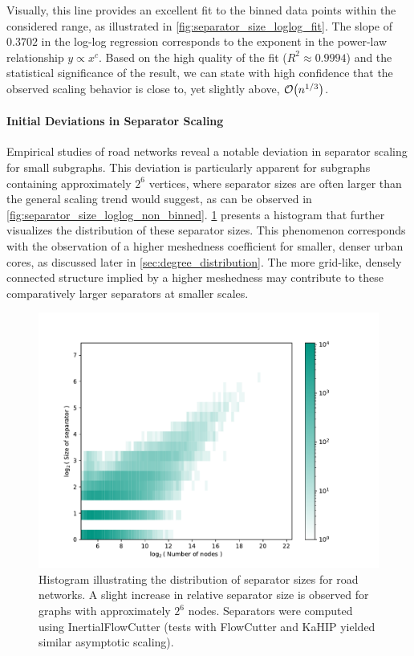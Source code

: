 Visually, this line provides an excellent fit to the binned data points within the considered range, as illustrated in \cref{fig:separator_size_loglog_fit}.
The slope of \( 0.3702 \) in the log-log regression corresponds to the exponent in the power-law relationship \( y \propto x^c \).
Based on the high quality of the fit (\( R^2 \approx 0.9994 \)) and the statistical significance of the result, we can state with high confidence that the observed scaling behavior is close to, yet slightly above, \( \mathcal{O}\!\left(n^{1/3}\right) \).

\paragraph{Initial Deviations in Separator Scaling}
Empirical studies of road networks reveal a notable deviation in separator scaling for small subgraphs.
This deviation is particularly apparent for subgraphs containing approximately \(2^6\) vertices, where separator sizes are often larger than the general scaling trend would suggest, as can be observed in \cref{fig:separator_size_loglog_non_binned}.
\cref{fig:real_europe_hist} presents a histogram that further visualizes the distribution of these separator sizes.
This phenomenon corresponds with the observation of a higher meshedness coefficient for smaller, denser urban cores, as discussed later in \cref{sec:degree_distribution}.
The more grid-like, densely connected structure implied by a higher meshedness may contribute to these comparatively larger separators at smaller scales.

\begin{figure}[tbhp]
    \centering
    \includegraphics[width=0.6\linewidth]{graphics/Germany-hist.pdf}
    \caption{Histogram illustrating the distribution of separator sizes for road networks. A slight increase in relative separator size is observed for graphs with approximately \(2^6\) nodes. Separators were computed using InertialFlowCutter (tests with FlowCutter and KaHIP yielded similar asymptotic scaling).}
    \label{fig:real_europe_hist}
\end{figure}

